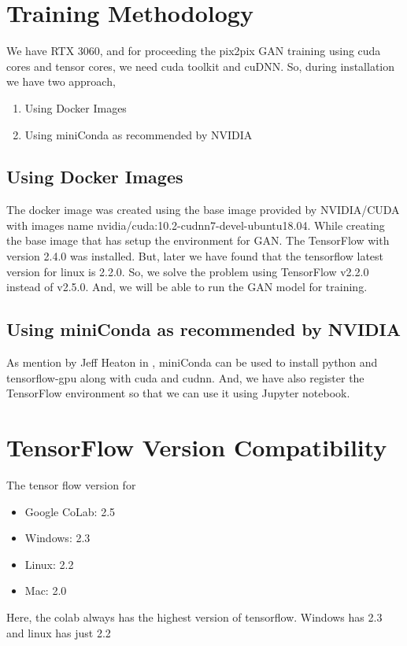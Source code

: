         
        \section{Training Methodology}
            We have RTX 3060, and for proceeding the pix2pix GAN training using cuda cores and tensor cores, we need cuda toolkit and cuDNN. So, during installation we have two approach, 
            \begin{enumerate}[label=\alph*.]
                \item Using Docker Images
                \item Using miniConda as recommended by NVIDIA
            \end{enumerate}
            \subsection{Using Docker Images}
	            The docker image was created using the base image provided by NVIDIA/CUDA with images name nvidia/cuda:10.2-cudnn7-devel-ubuntu18.04. While creating the base image that has setup the environment for GAN. The TensorFlow with version 2.4.0 was installed. But, later we have found that the tensorflow latest version for linux is 2.2.0. So, we solve the problem using TensorFlow v2.2.0 instead of v2.5.0. And, we will be able to run the GAN model for training. 
            \subsection{Using miniConda as recommended by NVIDIA}
                As mention by Jeff Heaton in \cite{heaton_2021}, miniConda can be used to install python and tensorflow-gpu along with cuda and cudnn. And, we have also register the TensorFlow environment so that we can use it using Jupyter notebook.
        \section{TensorFlow Version Compatibility}
            The tensor flow version for 
            \begin{itemize}
                \item Google CoLab: 2.5
                \item Windows: 2.3
                \item Linux: 2.2
                \item Mac: 2.0
            \end{itemize}
            Here, the colab always has the highest version of tensorflow. Windows has 2.3 and linux has just 2.2 

